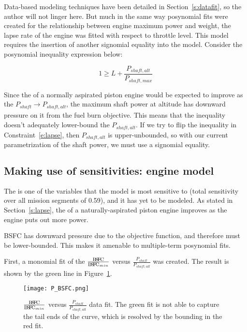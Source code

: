 Data-based modeling techniques have been detailed in Section~\ref{s:datafit}, so the author will
not linger here. But much in the same way posynomial fits were created for the relationship between
engine maximum power and weight, the lapse rate of the engine was fitted with respect to throttle level.
This model requires the insertion of another signomial equality into the model. Consider the
posynomial inequality expression below:

\begin{equation}
    \label{e:lapse}
    1 \geq L + \frac{P_{shaft,alt}}{P_{shaft,max}}
\end{equation}

Since the \BSFC of a normally aspirated piston engine would be expected to improve
as the $P_{shaft} \xrightarrow[]{} P_{shaft,alt}$, the maximum shaft
power at altitude has downward pressure on it from the fuel burn objective. This means that the
inequality doesn't adequately lower-bound the $P_{shaft,alt}$. If we try to flip the inequality in
Constraint~\ref{e:lapse}, then $P_{shaft,alt}$ is upper-unbounded, so with our current parametrization
of the shaft power, we must use a signomial equality.

\subsection{Making use of sensitivities: engine \BSFC model}
\label{s:BSFC}

The \BSFC is one of the variables that the model is most sensitive to (total sensitivity over all mission segments of 0.59),
and it has yet to be modeled. As
stated in Section~\ref{s:lapse}, the \BSFC of a naturally-aspirated piston engine improves as the engine puts out more power.

BSFC has downward pressure due to the objective function, and therefore must be lower-bounded. This makes
it amenable to multiple-term posynomial fits.

First, a monomial fit of the $\frac{\BSFC}{\BSFC_{min}}$ versus $\frac{P_{shaft}}{P_{shaft,alt}}$ was created.
The result is shown by the green line in Figure~\ref{f:P_BSFC}.

\begin{center}
    \begin{figure}
        \texttt{[image: P\_BSFC.png]}
        \caption[$\frac{\BSFC}{\BSFC_{min}}$ versus $\frac{P_{shaft}}{P_{shaft,alt}}$ data fit.]{$\frac{\BSFC}{\BSFC_{min}}$ versus $\frac{P_{shaft}}{P_{shaft,alt}}$ data fit. The green fit is
        not able to capture the tail ends of the curve, which is resolved by the bounding in the red fit.}
        \label{f:P_BSFC}
    \end{figure}
\end{center}


